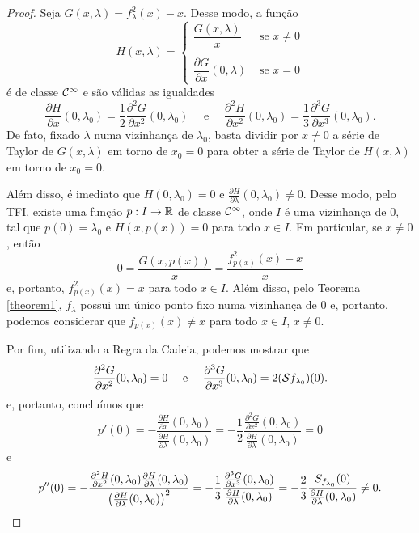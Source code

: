 \begin{proof}
Seja $G(x, \lambda) = f^2_\lambda (x) - x$. Desse modo, a função
\[ H(x, \lambda) =
    \begin{cases} 
      \dfrac{G(x, \lambda)}{x} & \textrm{ se } x \neq 0 \\
      \\
      \dfrac{\partial G}{\partial x}(0, \lambda) & \textrm{ se } x = 0
   \end{cases}
\]
é de classe $\mathcal{C}^\infty$ e são válidas as igualdades
$$\frac{\partial H}{\partial x}(0, \lambda_0) = \frac{1}{2}\frac{\partial^2 G}{\partial x^2}(0, \lambda_0) \quad \text{ e } \quad \frac{\partial^2 H}{\partial x^2}(0, \lambda_0) = \frac{1}{3} \frac{\partial^3 
G}{\partial x^3}(0, \lambda_0).$$
De fato, fixado $\lambda$ numa vizinhança de $\lambda_0$, basta dividir por $x \neq 0$ a série de Taylor de $G(x, \lambda)$ em torno de $x_0 = 0$ para obter a série de Taylor de $H(x, \lambda)$ em torno de $x_0 = 0$.

Além disso, é imediato que  $H(0, \lambda_0) = 0$ e $\frac{\partial H}{\partial \lambda}(0, \lambda_0) \neq 0$.
Desse modo, pelo TFI, existe uma função $p: I \to \mathbb{R}$ de classe $\mathcal{C}^\infty$, onde $I$ é uma vizinhança de $0$, tal que $p(0) = \lambda_0$ e $H(x, p(x)) = 0$ para todo $x \in I$. Em particular, se $x \neq 0$, então
$$0 = \frac{G(x, p(x))}{x} = \frac{f^2_{p(x)}(x) - x}{x}$$
e, portanto, $f^2_{p(x)}(x) = x$ para todo $x \in I$. Além disso, pelo Teorema \ref{theorem1}, $f_\lambda$ possui um único ponto fixo numa vizinhança de $0$ e, portanto, podemos considerar que $f_{p(x)}(x) \neq x$ para todo $x \in I$, $x \neq 0$.

Por fim, utilizando a Regra da Cadeia, podemos mostrar que
$$\frac{\partial^2 G}{\partial x^2}(0, \lambda_0) = 0 \quad \text{ e } \quad \frac{\partial^3 G}{\partial x^3}(0, \lambda_0) = 2 (\mathcal{S} f_{\lambda_0})(0).$$ 
e, portanto, concluímos que
$$p'(0) = -\frac{\frac{\partial H}{\partial x}(0, \lambda_0) }{\frac{\partial H }{\partial \lambda}(0, \lambda_0)} = -\frac{1}{2} \frac{\frac{\partial^2 G}{\partial x^2}(0, \lambda_0) }{\frac{\partial H }{\partial \lambda}(0, \lambda_0)} = 0$$
e
$$ p''(0) = - \frac{\frac{\partial^2 H}{\partial x^2}(0, \lambda_0)\frac{\partial H}{\partial \lambda}(0, \lambda_0)}{ \left( \frac{ \partial H}{\partial \lambda}(0, \lambda_0) \right)^2} \\
= -\frac{1}{3} \frac{\frac{\partial^3 G}{\partial x^3}(0, \lambda_0)}{\frac{\partial H}{\partial \lambda}(0, \lambda_0)} = -\frac{2}{3} \frac{S_{f_{\lambda_0}}(0)}{\frac{\partial H}{\partial \lambda}(0, \lambda_0)} \neq 0.$$
\end{proof}